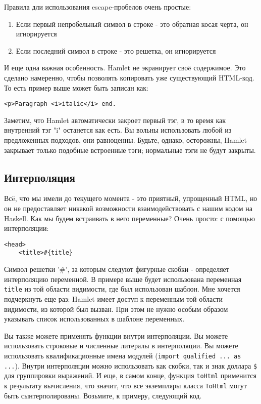Правила дли использования escape-пробелов очень простые:
\begin{enumerate}
\item Если первый непробельный символ в строке - это обратная косая черта, 
он игнорируется
\item Если последний символ в строке - это решетка, он игнорируется
\end{enumerate}

И еще одна важная особенность. Hamlet не экранирует своë содержимое.
Это сделано намеренно, чтобы позволять копировать уже существующий HTML-код.
То есть пример выше может быть записан как:
\begin{lstlisting}
<p>Paragraph <i>italic</i> end.
\end{lstlisting}

Заметим, что Hamlet автоматически закроет первый тэг, в то время как внутренний
тэг "i" останется как есть. Вы вольны использовать любой из предложенных
подходов, они равноценны. Будьте, однако, осторожны, Hamlet закрывает только
подобные встроенные тэги; нормальные тэги не будут закрыты.

\subsection{Интерполяция}
Всë, что мы имели до текущего момента - это приятный, упрощенный HTML, но он
не предоставляет никакой возможности взаимодействовать с нашим кодом на Haskell.
Как мы будем встраивать в него переменные? Очень просто: с помощью интерполяции:

\begin{lstlisting}
<head>
    <title>#{title}
\end{lstlisting}

Символ решетки '#', за которым следуют фигурные скобки - определяет интерполяцию
переменной. В примере выше будет использована переменная \lstinline!title! из той
области видимости, где был использован шаблон. Мне хочется подчеркнуть еще раз:
Hamlet имеет доступ к переменным той области видимости, из которой был вызван.
При этом не нужно особым образом указывать список использованных в шаблоне переменных.

Вы также можете применять функции внутри интерполяции. Вы можете использовать
строковые и численные литералы в интерполяции. Вы можете использовать 
квалификационные имена модулей (\lstinline!import qualified ... as ...!). Внутри
интерполяции можно использовать как скобки, так и знак доллара \texttt{\$}
для группировки выражений. И еще, в самом конце, функция \lstinline!toHtml!
применится к результату вычисления, что значит, что все экземпляры класса 
\lstinline!ToHtml! могут быть сынтерполированы. Возьмите, к примеру, следующий код.

